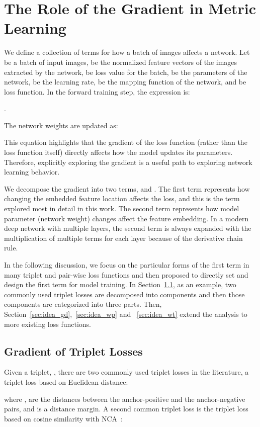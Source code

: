 \documentclass[10pt,twocolumn,letterpaper]{article}
\begin{document}
\section{The Role of the Gradient in Metric Learning}
We define a collection of terms for how a batch of images affects a network.
Let  be a batch of input images,  be the  normalized feature vectors of the images extracted by the network, 
 be loss value for the batch, 
 be the parameters of the network, 
 be the learning rate,
  be the mapping function of the network, and  be loss function. In the forward training step, the expression is:
 
. 

The network weights are updated as:


This equation highlights that the gradient of the loss function (rather than the loss function itself) directly affects how the model updates its parameters. Therefore, explicitly exploring the gradient is a useful path to exploring network learning behavior.

We decompose the gradient into two terms,  and . The first term represents how changing the embedded feature location affects the loss, and this is the term explored most in detail in this work. The second term represents how model parameter (network weight) changes affect the feature embedding.  In a modern deep network with multiple layers, the second term is always expanded with the multiplication of multiple terms for each layer because of the derivative chain rule.

In the following discussion, we focus on the particular forms of the first term in many triplet and pair-wise loss functions and then proposed to directly set and design the first term for model training. In Section~\ref{sec:idea}, as an example, two commonly used triplet losses are decomposed into components and then those components are categorized into three parts. Then, Section~\ref{sec:idea_gd},~\ref{sec:idea_wp} and ~\ref{sec:idea_wt} extend the analysis to more existing loss functions.

\subsection{Gradient of Triplet Losses}
\label{sec:idea}
Given a triplet, , there are two commonly used triplet losses in the literature, a triplet loss based on Euclidean distance:

where ,  are the distances between the anchor-positive and the anchor-negative pairs, and  is a distance margin. A second common triplet loss is the triplet loss based on cosine similarity with NCA~\cite{nca}:
\end{document}
